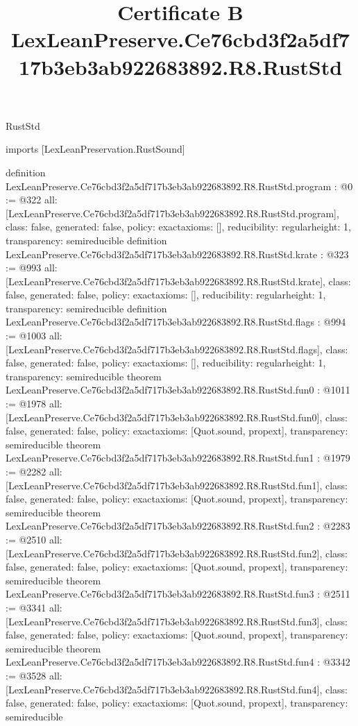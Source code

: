 \begin{lexlean}{RustStd}
\title{Certificate B LexLeanPreserve.Ce76cbd3f2a5df717b3eb3ab922683892.R8.RustStd}
\begin{coremodule}
imports [LexLeanPreservation.RustSound]

definition LexLeanPreserve.Ce76cbd3f2a5df717b3eb3ab922683892.R8.RustStd.program : @0 := @322 {
  all: [LexLeanPreserve.Ce76cbd3f2a5df717b3eb3ab922683892.R8.RustStd.program],
  class: false,
  generated: false,
  policy: exact{axioms: []},
  reducibility: regular{height: 1},
  transparency: semireducible
}
definition LexLeanPreserve.Ce76cbd3f2a5df717b3eb3ab922683892.R8.RustStd.krate : @323 := @993 {
  all: [LexLeanPreserve.Ce76cbd3f2a5df717b3eb3ab922683892.R8.RustStd.krate],
  class: false,
  generated: false,
  policy: exact{axioms: []},
  reducibility: regular{height: 1},
  transparency: semireducible
}
definition LexLeanPreserve.Ce76cbd3f2a5df717b3eb3ab922683892.R8.RustStd.flags : @994 := @1003 {
  all: [LexLeanPreserve.Ce76cbd3f2a5df717b3eb3ab922683892.R8.RustStd.flags],
  class: false,
  generated: false,
  policy: exact{axioms: []},
  reducibility: regular{height: 1},
  transparency: semireducible
}
theorem LexLeanPreserve.Ce76cbd3f2a5df717b3eb3ab922683892.R8.RustStd.fun0 : @1011 := @1978 {
  all: [LexLeanPreserve.Ce76cbd3f2a5df717b3eb3ab922683892.R8.RustStd.fun0],
  class: false,
  generated: false,
  policy: exact{axioms: [Quot.sound, propext]},
  transparency: semireducible
}
theorem LexLeanPreserve.Ce76cbd3f2a5df717b3eb3ab922683892.R8.RustStd.fun1 : @1979 := @2282 {
  all: [LexLeanPreserve.Ce76cbd3f2a5df717b3eb3ab922683892.R8.RustStd.fun1],
  class: false,
  generated: false,
  policy: exact{axioms: [Quot.sound, propext]},
  transparency: semireducible
}
theorem LexLeanPreserve.Ce76cbd3f2a5df717b3eb3ab922683892.R8.RustStd.fun2 : @2283 := @2510 {
  all: [LexLeanPreserve.Ce76cbd3f2a5df717b3eb3ab922683892.R8.RustStd.fun2],
  class: false,
  generated: false,
  policy: exact{axioms: [Quot.sound, propext]},
  transparency: semireducible
}
theorem LexLeanPreserve.Ce76cbd3f2a5df717b3eb3ab922683892.R8.RustStd.fun3 : @2511 := @3341 {
  all: [LexLeanPreserve.Ce76cbd3f2a5df717b3eb3ab922683892.R8.RustStd.fun3],
  class: false,
  generated: false,
  policy: exact{axioms: [Quot.sound, propext]},
  transparency: semireducible
}
theorem LexLeanPreserve.Ce76cbd3f2a5df717b3eb3ab922683892.R8.RustStd.fun4 : @3342 := @3528 {
  all: [LexLeanPreserve.Ce76cbd3f2a5df717b3eb3ab922683892.R8.RustStd.fun4],
  class: false,
  generated: false,
  policy: exact{axioms: [Quot.sound, propext]},
  transparency: semireducible
}
\end{coremodule}
\end{lexlean}
